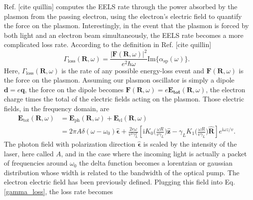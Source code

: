 \documentclass [11pt, proquest] {uwthesis}[2016/11/22]
\begin{document}
Ref. [cite quillin] computes the EELS rate through the power absorbed by the plasmon from the passing electron, using the electron's electric field to quantify the force on the plasmon. Interestingly, in the event that the plasmon is forced by both light and an electron beam simultaneously, the EELS rate becomes a more complicated loss rate. According to the definition in Ref. [cite quillin]
\begin{equation}
\Gamma_{\textrm{loss}}(\textbf{R},\omega) = \frac{|\textbf{F}(\textbf{R},\omega)|^2}{e^2\hbar\omega}\textrm{Im}\{\alpha_{\textrm{sp}}(\omega)\}.
\label{gamma_loss}
\end{equation}
Here, $\Gamma_{\textrm{loss}}(\textbf{R},\omega)$ is the rate of any possible energy-loss event and $\textbf{F}(\textbf{R},\omega)$ is the force on the plasmon. Assuming our plasmon oscillator is simply a dipole $\textbf{d}=e\textbf{q}$, the force on the dipole becomes $\textbf{F}(\textbf{R},\omega) = e\textbf{E}_{\textbf{tot}}(\textbf{R},\omega)$, the electron charge times the total of the electric fields acting on the plasmon. Those electric fields, in the frequency domain, are
\begin{equation}
\begin{aligned}
\textbf{E}_{\textrm{tot}}(\textbf{R},\omega) &= \textbf{E}_{\textrm{ph}}(\textbf{R},\omega) + \textbf{E}_{\textrm{el}}(\textbf{R},\omega)\\
& = 2\pi A\delta(\omega-\omega_0)\hat{\boldsymbol{\epsilon}} + \frac{2e\omega}{v^2\gamma_L^2}\left[ \textrm{i}K_0\big( \frac{\omega R}{v\gamma_L} \big)\hat{\textbf{z}} -  \gamma_L K_1\big( \frac{\omega R}{v\gamma_L} \big)\hat{\textbf{R}}\right]e^{\textrm{i}\omega z/v}.
\label{fields_sum}
\end{aligned}
\end{equation}
The photon field with polarization direction $\hat{\boldsymbol{\epsilon}}$ is scaled by the intensity of the laser, here called $A$, and in the case where the incoming light is actually a packet of frequencies around $\omega_0$ the delta function becomes a lorentzian or gaussian distribution whose width is related to the bandwidth of the optical pump. The electron electric field has been previously defined. Plugging this field into Eq. \ref{gamma_loss}, the loss rate becomes
\end{document}
